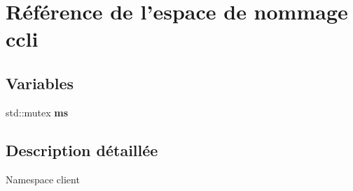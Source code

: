 \hypertarget{namespaceccli}{\section{Référence de l'espace de nommage ccli}
\label{namespaceccli}
}
\subsection*{Variables}
\begin{DoxyCompactItemize}
\item 
\hypertarget{namespaceccli_abd9b5c419c288a34236b2e31a58bac3e}{std\-::mutex {\bfseries ms}}\label{namespaceccli_abd9b5c419c288a34236b2e31a58bac3e}

\end{DoxyCompactItemize}


\subsection{Description détaillée}
Namespace client 